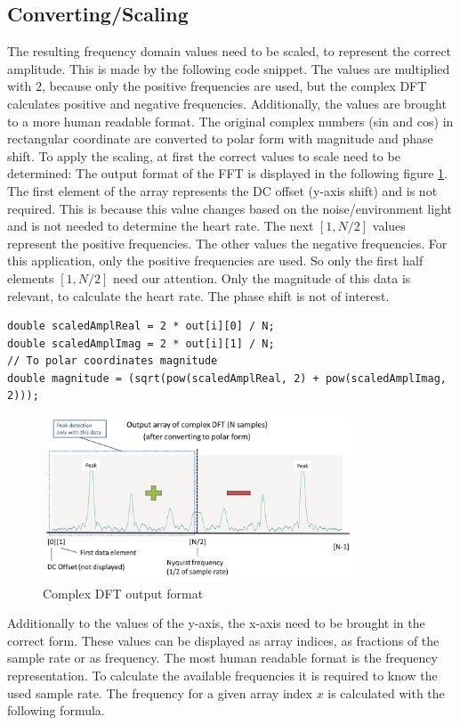 \documentclass[notitlepage]{scrreprt}
\begin{document}
\subsection{Converting/Scaling}
The resulting frequency domain values need to be scaled, to represent the correct amplitude. This is made by the following code snippet. The values are multiplied with $2$, because only the positive frequencies are used, but the complex DFT calculates positive and negative frequencies. Additionally, the values are brought to a more human readable format. The original complex numbers (sin and cos) in rectangular coordinate are converted to polar form with magnitude and phase shift. To apply the scaling, at first the correct values to scale need to be determined: The output format of the FFT is displayed in the following figure \ref{fig:output-format}. The first element of the array represents the DC offset (y-axis shift) and is not required. This is because this value changes based on the noise/environment light and is not needed to determine the heart rate. The next $[1, N/2]$ values represent the positive frequencies. The other values the negative frequencies. For this application, only the positive frequencies are used. So only the first half elements $[1, N/2]$ need our attention. Only the magnitude of this data is relevant, to calculate the heart rate. The phase shift is not of interest.

\begin{lstlisting}[caption=FFT.c]
double scaledAmplReal = 2 * out[i][0] / N;
double scaledAmplImag = 2 * out[i][1] / N;
// To polar coordinates magnitude
double magnitude = (sqrt(pow(scaledAmplReal, 2) + pow(scaledAmplImag, 2)));
\end{lstlisting}

\begin{figure}[H]
	\centering
	\includegraphics[width=350px]{images/outputFormat.png}
	\caption{Complex DFT output format}
	\label{fig:output-format}
\end{figure}

Additionally to the values of the y-axis, the x-axis need to be brought in the correct form. These values can be displayed as array indices, as fractions of the sample rate or as frequency. The most human readable format is the frequency representation. To calculate the available frequencies it is required to know the used sample rate. The frequency for a given array index $x$ is calculated with the following formula.
\end{document}
